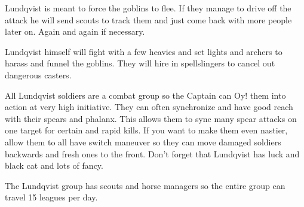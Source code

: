 \raggedbottom

Lundqvist is meant to force the goblins to flee. If they manage to drive off the attack he will send scouts to track them and just come back with more people later on. Again and again if necessary.

Lundqvist himself will fight with a few heavies and set lights and archers to harass and funnel the goblins. They will hire in spellslingers to cancel out dangerous casters. 

All Lundqvist soldiers are a combat group so the Captain can Oy! them into action at very high initiative. They can often synchronize and have good reach with their spears and phalanx. This allows them to sync many spear attacks on one target for certain and rapid kills. If you want to make them even nastier, allow them to all have switch maneuver so they can move damaged soldiers backwards and fresh ones to the front.
Don't forget that Lundqvist has luck and black cat and lots of fancy.

The Lundqvist group has scouts and horse managers so the entire group can travel 15 leagues per day.


